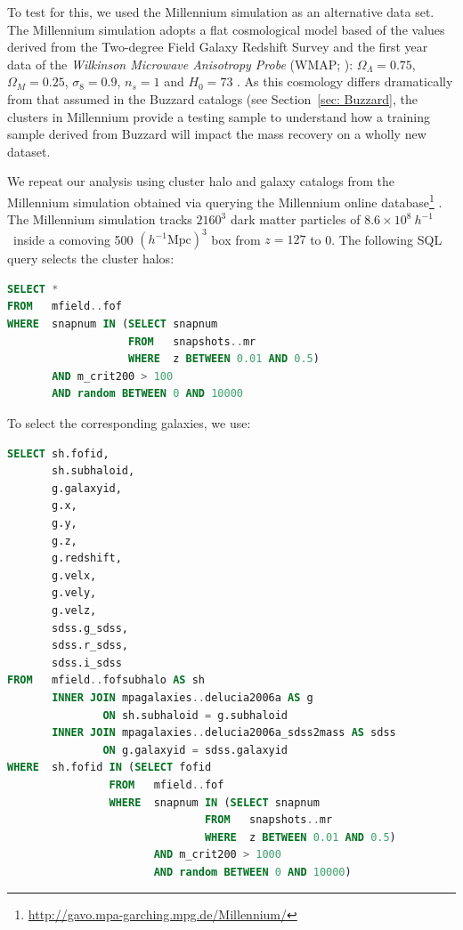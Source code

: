 \documentclass[fleqn,usenatbib]{mnras}
\begin{document}
To test for this, we used the Millennium simulation \citep{Springel2005a} as an alternative data set. The Millennium simulation adopts a flat cosmological model based of the values derived from the Two-degree Field Galaxy Redshift Survey \citep{Colless2001} and the first year data of the \emph{Wilkinson Microwave Anisotropy Probe} (WMAP; \citealt{Spergel2003}): $\Omega_\Lambda = 0.75$, $\Omega_M = 0.25$, $\sigma_8 = 0.9$, $n_s = 1$ and $H_0= 73$ \kms \mpc. As this cosmology differs dramatically from that assumed in the Buzzard catalogs (see Section~\ref{sec: Buzzard}, the clusters in Millennium provide a testing sample to understand how a training sample derived from Buzzard will impact the mass recovery on a wholly new dataset. 

We repeat our analysis using cluster halo and galaxy catalogs from the Millennium simulation obtained via querying the Millennium online database\footnote{\url{http://gavo.mpa-garching.mpg.de/Millennium/}} \citep{Lemson2006}. The Millennium simulation tracks $2160^3$ dark matter particles of $8.6\times 10^8 ~h^{-1}$ \Msol\ inside a comoving 500 $(h^{-1} \mathrm{Mpc})^3$ box from $z=127$ to 0. The following SQL query selects the cluster halos:
\begin{lstlisting}[language=SQL]
SELECT * 
FROM   mfield..fof 
WHERE  snapnum IN (SELECT snapnum 
                   FROM   snapshots..mr 
                   WHERE  z BETWEEN 0.01 AND 0.5) 
       AND m_crit200 > 100 
       AND random BETWEEN 0 AND 10000 
\end{lstlisting}
To select the corresponding galaxies, we use:
\begin{lstlisting}[language=SQL, breaklines=true]
SELECT sh.fofid, 
       sh.subhaloid, 
       g.galaxyid, 
       g.x, 
       g.y, 
       g.z, 
       g.redshift, 
       g.velx, 
       g.vely, 
       g.velz, 
       sdss.g_sdss, 
       sdss.r_sdss, 
       sdss.i_sdss 
FROM   mfield..fofsubhalo AS sh 
       INNER JOIN mpagalaxies..delucia2006a AS g 
               ON sh.subhaloid = g.subhaloid 
       INNER JOIN mpagalaxies..delucia2006a_sdss2mass AS sdss 
               ON g.galaxyid = sdss.galaxyid 
WHERE  sh.fofid IN (SELECT fofid 
                FROM   mfield..fof 
                WHERE  snapnum IN (SELECT snapnum 
                               FROM   snapshots..mr 
                               WHERE  z BETWEEN 0.01 AND 0.5) 
                       AND m_crit200 > 1000 
                       AND random BETWEEN 0 AND 10000) 
\end{lstlisting}
\end{document}
